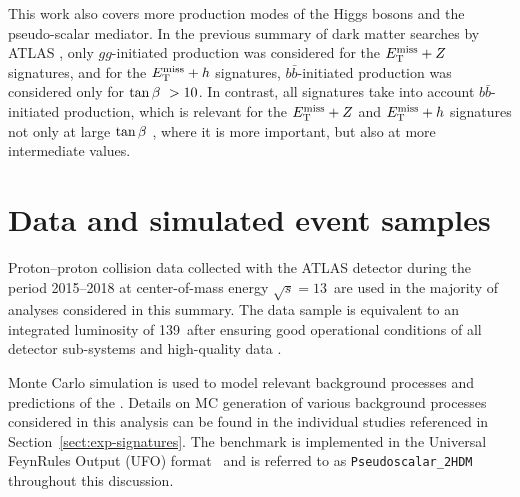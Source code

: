 This work also covers more production modes of the Higgs bosons and the pseudo-scalar mediator. In the previous summary of dark matter searches by ATLAS \cite{EXOT-2017-32}, only $gg$-initiated production was considered for the $E_{\mathrm{T}}^{\mathrm{miss}}+Z$ signatures, and for the $E_{\mathrm{T}}^{\mathrm{miss}}+h$ signatures, $b\bar{b}$-initiated production was considered only for $\tan\beta~>10$. In contrast, all \met signatures take into account $b\bar{b}$-initiated production, which is relevant for the $E_{\mathrm{T}}^{\mathrm{miss}}+Z$ and $E_{\mathrm{T}}^{\mathrm{miss}}+h$ signatures not only at large $\tan\beta~$, where it is more important, but also at more intermediate values\cite{2hdma_comb}.

\section{Data and simulated event samples}

Proton--proton collision data collected with the ATLAS detector during the period 2015--2018 at center-of-mass energy $\sqrt{s}=13$~\TeV are used in the majority of analyses considered in this summary. The data sample is equivalent to an integrated luminosity of 139~\ifb after ensuring good operational conditions of all detector sub-systems and high-quality data \cite{DAPR-2018-01}.

Monte Carlo simulation is used to model relevant background processes and predictions of the \hdma. Details on MC generation of various background processes considered in this analysis can be found in the individual studies referenced in Section~\ref{sect:exp-signatures}. The \thdma benchmark is implemented in the Universal FeynRules Output (UFO) format~\cite{Degrande:2011ua} and is referred to as \texttt{Pseudoscalar\_2HDM} throughout this discussion.

